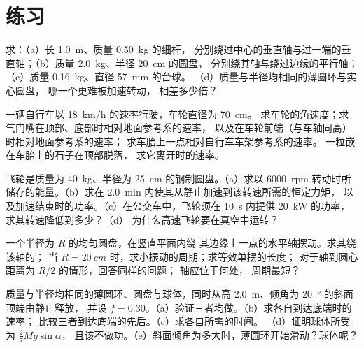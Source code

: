 \section{练习}

\begin{exercise}[$\star$]\label{exo:b2:rigid-body-mechanics:1}
求：（a）长 \qty{1.0}{m}、质量 \qty{0.50}{kg} 的细杆，
分别绕过中心的垂直轴与过一端的垂直轴；（b）质量 \qty{2.0}{kg}、半径 \qty{20}{cm} 的圆盘，
分别绕其轴与绕过边缘的平行轴；（c）质量 \qty{0.16}{kg}、直径 \qty{57}{mm} 的台球。
（d）质量与半径均相同的薄圆环与实心圆盘，
哪一个更难被加速转动，
相差多少倍？
\end{exercise}

\begin{exercise}[$\star$]\label{exo:b2:rigid-body-mechanics:2}
一辆自行车以 \qty{18}{km/h} 的速率行驶，车轮直径为 \qty{70}{cm}。
求车轮的角速度；求气门嘴在顶部、底部时相对地面参考系的速率，
以及在车轮前端（与车轴同高）时相对地面参考系的速率；
求车胎上一点相对自行车车架参考系的速率。
一粒嵌在车胎上的石子在顶部脱落，
求它离开时的速率。
\end{exercise}

\begin{exercise}[$\star$]\label{exo:b2:rigid-body-mechanics:3}
飞轮是质量为 \qty{40}{kg}、半径为 \qty{25}{cm} 的钢制圆盘。（a）求以
\qty{6000}{rpm} 转动时所储存的能量。（b）求在 \qty{2.0}{min} 内使其从静止加速到该转速所需的恒定力矩，
以及加速结束时的功率。（c）在公交车中，飞轮须在 \qty{10}{s} 内提供 \qty{20}{kW} 的功率，
求其转速降低到多少？（d）
为什么高速飞轮要在真空中运转？
\end{exercise}

\begin{exercise}[$\star$]\label{exo:b2:rigid-body-mechanics:4}
一个半径为 $R$ 的均匀圆盘，在竖直平面内绕
其边缘上一点的水平轴摆动。求其绕该轴的；
当 $R = \qty{20}{cm}$ 时，求小振动的周期；求等效单摆的长度；
对于轴到圆心距离为 $R/2$ 的情形，回答同样的问题；
轴应位于何处，
周期最短？
\end{exercise}

\begin{exercise}[$\star\star$]\label{exo:b2:rigid-body-mechanics:5}
质量与半径均相同的薄圆环、圆盘与球体，同时从高 \qty{2.0}{m}、倾角为 \qty{20}{\degree} 的斜面顶端由静止释放，
并设 $f =
0.30$。（a）验证三者均做。（b）求各自到达底端时的速率；
比较三者到达底端的先后。（c）求各自所需的时间。
（d）证明球体所受为 $\tfrac27Mg\sin\alpha$，
且该不做功。（e）斜面倾角为多大时，薄圆环开始滑动？球体呢？
\end{exercise}

